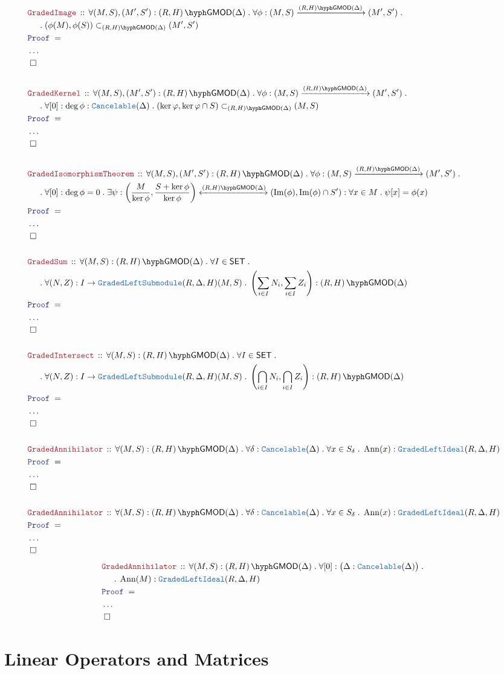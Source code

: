 \documentclass[12pt]{scrartcl}
\newcommand{\TYPE}[1]{\textcolor{NavyBlue}{\mathtt{#1}}}
\newcommand{\LOGIC}[1]{\textcolor{Blue}{\mathtt{#1}}}
\newcommand{\THM}[1]{\textcolor{Maroon}{\mathtt{#1}}}
\renewcommand{\.}{\; . \;}
\newcommand{\Act}[1]{\left(#1\right)}
\newcommand{\Theorem}[2]{& \THM{#1} \, :: \, #2 \\ & \Proof = \\ }
\newcommand{\NewLine}{\\ & \kern 1pc}
\newcommand{\Page}[1]{ \begin{align*} #1 \end{align*}   }
\newcommand{\NoProof}{ & \ldots \\ \EndProof}
\DeclareMathOperator*{\im}{Im}
\newcommand{\QED}{\; \square}
\newcommand{\EndProof}{& \QED \\}
\newcommand{\Proof}{\LOGIC{Proof} \; }
\newcommand{\Arrow}[1]{\xrightarrow{#1}}
\newcommand{\ToIso}[1]{\xleftrightarrow{#1}}
\newcommand{\SET}{\mathsf{SET}}
\newcommand{\gsubmod}[3]{\subset_{\GLMOD{#1}{#2}{#3}}}
\DeclareMathOperator{\Ann}{Ann}
\newcommand{\GLMOD}[3]{\Act{#1,#2}\hyph\mathsf{GMOD}(#3)}
\begin{document}
\Page{
	\Theorem{GradedImage}{ 
		\forall (M,S),(M',S') : \GLMOD{R}{H}{\Delta} \.
		\forall \phi : (M,S) \Arrow{\GLMOD{R}{H}{\Delta}} (M',S') \. \NewLine \.
		(\phi(M),\phi(S)) \gsubmod{R}{H}{\Delta} (M',S')
	}
	\NoProof
	\\
	\Theorem{GradedKernel}
	{    
		\forall (M,S),(M',S') : \GLMOD{R}{H}{\Delta} \.
		\forall \phi : (M,S) \Arrow{\GLMOD{R}{H}{\Delta}} (M',S') \. \NewLine \.
		\forall [0] : \deg \phi : \TYPE{Cancelable}(\Delta) \.  
		(\ker \varphi,\ker \varphi \cap S) \gsubmod{R}{H}{\Delta}  (M,S)
	}
	\NoProof
	\\
	\Theorem{GradedIsomorphismTheorem}
	{
		\forall (M,S),(M',S') : \GLMOD{R}{H}{\Delta} \.
		\forall \phi : (M,S) \Arrow{\GLMOD{R}{H}{\Delta}} (M',S') \. \NewLine \.
		\forall [0] : \deg \phi = 0 \.
		\exists \psi : \left( \frac{M}{\ker \phi}, \frac{S + \ker \phi}{\ker \phi} \right) 
		\ToIso{\GLMOD{R}{H}{\Delta} } (\im(\phi),\im(\phi) \cap S') :
		\forall x \in M \. \psi[x] = \phi(x) 
	}
	\NoProof
	\\
	\Theorem{GradedSum}
	{
		\forall (M,S) : \GLMOD{R}{H}{\Delta} \.
		\forall I \in \SET \. \NewLine \. 
		\forall (N,Z) : I \to \TYPE{GradedLeftSubmodule}(R,\Delta,H)(M,S) \. 
		\left(  \sum_{i \in I} N_i, \sum_{i \in I} Z_i \right) : \GLMOD{R}{H}{\Delta}
	}
	\NoProof
	\\
	\Theorem{GradedIntersect}
	{
		\forall (M,S) : \GLMOD{R}{H}{\Delta} \.
		\forall I \in \SET \. \NewLine \. 
		\forall (N,Z) : I \to \TYPE{GradedLeftSubmodule}(R,\Delta,H)(M,S) \. 
		\left(  \bigcap_{i \in I} N_i, \bigcap_{i \in I} Z_i \right) : \GLMOD{R}{H}{\Delta}
	}
	\NoProof
	\\
	\Theorem{GradedAnnihilator}{
		\forall (M,S) : \GLMOD{R}{H}{\Delta} \. 
		\forall \delta : \TYPE{Cancelable}(\Delta) \.
		\forall x \in S_\delta \. 
		\Ann(x) : \TYPE{GradedLeftIdeal}(R,\Delta,H) 
	}
	\NoProof
	\\
	\Theorem{GradedAnnihilator}{
		\forall (M,S) : \GLMOD{R}{H}{\Delta} \. 
		\forall \delta : \TYPE{Cancelable}(\Delta) \.
		\forall x \in S_\delta \. 
		\Ann(x) : \TYPE{GradedLeftIdeal}(R,\Delta,H) 
	}
	\NoProof
}\Page{
	\Theorem{GradedAnnihilator}{
		\forall (M,S) : \GLMOD{R}{H}{\Delta} \. 
		\forall [0]  : \big(\Delta :\TYPE{Cancelable}(\Delta)\big) \. \NewLine \.  
		\Ann(M) : \TYPE{GradedLeftIdeal}(R,\Delta,H) 
	}
	\NoProof
}
\newpage
\section{Linear Operators and Matrices}
\end{document}
